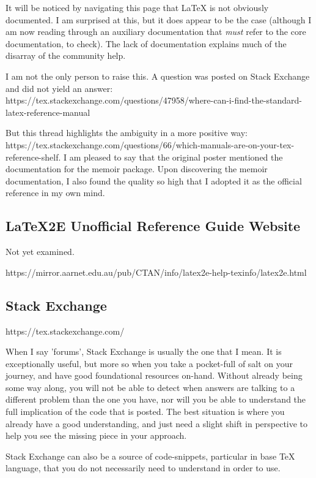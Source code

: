 \documentclass[12pt, oneside]{memoir}
\begin{document}
It will be noticed by navigating this page that LaTeX is not obviously documented. I am surprised at this, but it does appear to be the case (although I am now reading through an auxiliary documentation that \emph{must} refer to the core documentation, to check). The lack of documentation explains much of the disarray of the community help.

I am not the only person to raise this. A question was posted on Stack Exchange and did not yield an answer: https://tex.stackexchange.com/questions/47958/where-can-i-find-the-standard-latex-reference-manual

But this thread highlights the ambiguity in a more positive way: https://tex.stackexchange.com/questions/66/which-manuals-are-on-your-tex-reference-shelf. I am pleased to say that the original poster mentioned the documentation for the memoir package. Upon discovering the memoir documentation, I also found the quality so high that I adopted it as the official reference in my own mind.

\subsection*{LaTeX2E Unofficial Reference Guide Website}

Not yet examined.

https://mirror.aarnet.edu.au/pub/CTAN/info/latex2e-help-texinfo/latex2e.html

\subsection{Stack Exchange}

https://tex.stackexchange.com/

When I say 'forums', Stack Exchange is usually the one that I mean. It is exceptionally useful, but more so when you take a pocket-full of salt on your journey, and have good foundational resources on-hand. Without already being some way along, you will not be able to detect when answers are talking to a different problem than the one you have, nor will you be able to understand the full implication of the code that is posted. The best situation is where you already have a good understanding, and just need a slight shift in perspective to help you see the missing piece in your approach.

Stack Exchange can also be a source of code-snippets, particular in base TeX language, that you do not necessarily need to understand in order to use.
\end{document}
